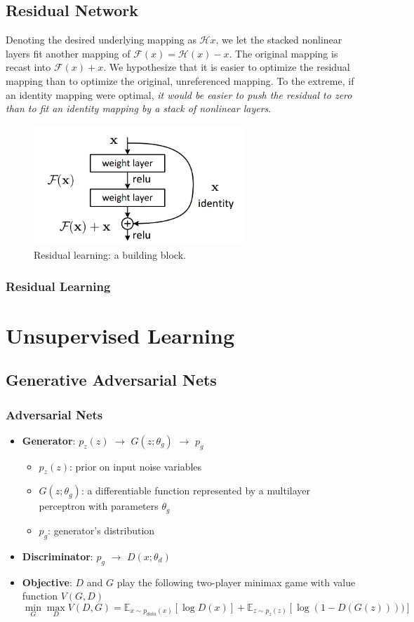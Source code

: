 \documentclass[a3paper, 12pt]{book} %
\begin{document}
\section{Residual Network}
Denoting the desired underlying mapping as $\mathcal{H}{x}$, we let the stacked nonlinear
layers fit another mapping of $\mathcal{F}{(x)}=\mathcal{H}{(x)}-x$. The original mapping is recast into $\mathcal{F}{(x)}+x$. We hypothesize that it
is easier to optimize the residual mapping than to optimize
the original, unreferenced mapping. To the extreme, if an
identity mapping were optimal, \emph{it would be easier to push
the residual to zero than to fit an identity mapping by a stack of nonlinear layers}.
\begin{figure}[htpb]
	\centering
	\includegraphics[width=8cm]{figures/resnet.png}
	\caption{Residual learning: a building block.}
	\label{fig:boat1}
\end{figure}
\subsection{Residual Learning}





\chapter{Unsupervised Learning}
\section{Generative Adversarial Nets}
\subsection{Adversarial Nets}
\begin{itemize}
	\item \textbf{Generator}: $p_z(z)$ $\to$ $G(z;\theta_g)$ $\to$ $p_g$
	\begin{itemize}
		\item $p_z(z)$: prior on input noise variables
		\item $G(z;\theta_g)$: a differentiable function represented by a multilayer perceptron with parameters $\theta_g$
		\item $p_g$: generator's distribution
	\end{itemize}
	\item \textbf{Discriminator}: $p_g$ $\to$ $D(x;\theta_d)$
	\item \textbf{Objective}: $D$ and $G$ play the following two-player minimax game with value function $V(G, D)$
	$$\min_G\max_D{V(D,G)}=\mathbb{E}_{x\sim p_{data}{(x)}}[\log{D(x)}]+\mathbb{E}_{z\sim p_{z}{(z)}}[\log{(1-D(G(z))))}]$$
\end{itemize}
\end{document}
